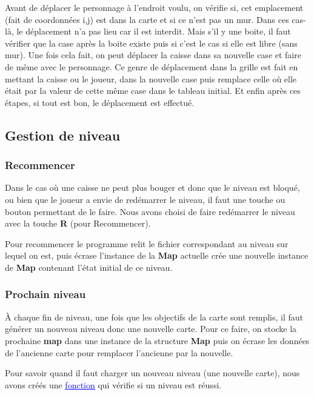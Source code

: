 \documentclass[french, 12pt]{article}
\begin{document}
       Avant de déplacer le personnage à l'endroit voulu, on vérifie si, cet emplacement (fait de coordonnées i,j) est dans la carte et si ce n'est pas un mur. Dans ces cas-là, le déplacement n'a pas lieu car il est interdit. Mais s'il y une boite, il faut vérifier que la case après la boite existe puis si c'est le cas si elle est libre (sans mur). Une fois cela fait, on peut déplacer la caisse dans sa nouvelle case et faire de même avec le personnage. Ce genre de déplacement dans la grille est fait en mettant la caisse ou le joueur, dans la nouvelle case puis remplace celle où elle était par la valeur de cette même case dans le tableau initial.
       Et enfin après ces étapes, si tout est bon, le déplacement est effectué.


   \subsection{Gestion de niveau}
       \subsubsection{Recommencer}
       Dans le cas où une caisse ne peut plus bouger et donc que le niveau est bloqué, ou bien que le joueur a envie de redémarrer le niveau, il faut une touche ou bouton permettant de le faire.
       Nous avons choisi de faire redémarrer le niveau avec la touche \textbf{R} (pour Recommencer).

       Pour recommencer le programme relit le fichier correspondant au niveau sur lequel on est, puis écrase l'instance de la \textbf{Map} actuelle crée une nouvelle instance de \textbf{Map} contenant l'état initial de ce niveau.


       \subsubsection{Prochain niveau}


       À chaque fin de niveau, une fois que les objectifs de la carte sont remplis, il faut générer un nouveau niveau donc une nouvelle carte.
       Pour ce faire, on stocke la prochaine \textbf{map} dans une instance de la structure \textbf{Map} puis on écrase les données de l'ancienne carte pour remplacer l'ancienne par la nouvelle.

       Pour savoir quand il faut charger un nouveau niveau (une nouvelle carte), nous avons créés une \href{../doc/html/move_8h.html}{\textcolor{blue}{\underline{fonction}}} qui vérifie si un niveau est réussi.
\end{document}
